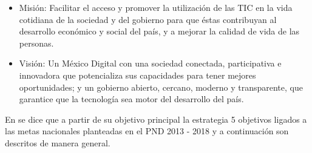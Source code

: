 \documentclass[runningheads,a4paper]{llncs}
\begin{document}
\begin{itemize}
	\item Misión: Facilitar el acceso y promover la utilización de las TIC en la vida cotidiana de la
sociedad y del gobierno para que éstas contribuyan al desarrollo económico y social del
país, y a mejorar la calidad de vida de las personas.\\
	\item Visión: Un México Digital con una sociedad conectada, participativa e innovadora que
potencializa sus capacidades para tener mejores oportunidades; y un gobierno abierto,
cercano, moderno y transparente, que garantice que la tecnología sea motor del desarrollo del país.
\end{itemize}

En \cite{EDN_1} se dice que a partir de su objetivo principal la estrategia 5 objetivos ligados a las metas nacionales planteadas en el \gls{PND} 2013 - 2018 y a continuación son descritos de manera general.\\
\end{document}
